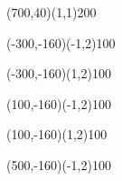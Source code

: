 \documentclass[12pt]{article}
\begin{document}
\begin{figure}[htb]
\begin{egame}
\putbranch(700,40)(1,1){200}

\renewcommand{\egarrowstyle}{}

\putbranch(-300,-160)(-1,2){100}

\renewcommand{\egarrowstyle}{}

\putbranch(-300,-160)(1,2){100}

\renewcommand{\egarrowstyle}{}

\putbranch(100,-160)(-1,2){100}

\renewcommand{\egarrowstyle}{}

\putbranch(100,-160)(1,2){100}

\renewcommand{\egarrowstyle}{}

\putbranch(500,-160)(-1,2){100}

\renewcommand{\egarrowstyle}{}


\end{egame}
\end{figure}
\end{document}
